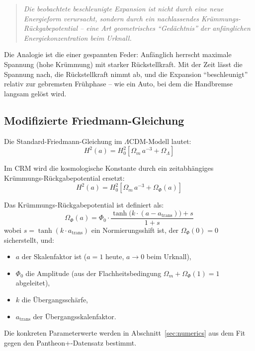 \documentclass[aps,prd,twocolumn,superscriptaddress,nofootinbib]{revtex4-2}
\begin{document}
\begin{quote}
\textit{Die beobachtete beschleunigte Expansion ist nicht durch eine neue Energieform verursacht, sondern durch ein nachlassendes Krümmungs-Rückgabepotential -- eine Art geometrisches ``Gedächtnis'' der anfänglichen Energiekonzentration beim Urknall.}
\end{quote}

Die Analogie ist die einer gespannten Feder: Anfänglich herrscht maximale Spannung (hohe Krümmung) mit starker Rückstellkraft. Mit der Zeit lässt die Spannung nach, die Rückstellkraft nimmt ab, und die Expansion ``beschleunigt'' relativ zur gebremsten Frühphase -- wie ein Auto, bei dem die Handbremse langsam gelöst wird.

\subsection{Modifizierte Friedmann-Gleichung}
\label{subsec:friedmann}

Die Standard-Friedmann-Gleichung im $\Lambda$CDM-Modell lautet:
\begin{equation}
H^2(a) = H_0^2 \left[\Omega_m\,a^{-3} + \Omega_\Lambda\right]
\label{eq:friedmann_lcdm}
\end{equation}

Im CRM wird die kosmologische Konstante durch ein zeitabhängiges Krümmungs-Rückgabepotential ersetzt:
\begin{equation}
H^2(a) = H_0^2 \left[\Omega_m\,a^{-3} + \Omega_\Phi(a)\right]
\label{eq:friedmann_cfm}
\end{equation}

Das Krümmungs-Rückgabepotential ist definiert als:
\begin{equation}
\Omega_\Phi(a) = \Phi_0 \cdot \frac{\tanh\!\big(k\cdot(a - a_{\mathrm{trans}})\big) + s}{1 + s}
\label{eq:potential_cfm}
\end{equation}
wobei $s = \tanh(k \cdot a_{\mathrm{trans}})$ ein Normierungsshift ist, der $\Omega_\Phi(0) = 0$ sicherstellt, und:
\begin{itemize}
\item $a$ der Skalenfaktor ist ($a=1$ heute, $a \to 0$ beim Urknall),
\item $\Phi_0$ die Amplitude (aus der Flachheitsbedingung $\Omega_m + \Omega_\Phi(1) = 1$ abgeleitet),
\item $k$ die Übergangsschärfe,
\item $a_{\mathrm{trans}}$ der Übergangsskalenfaktor.
\end{itemize}
Die konkreten Parameterwerte werden in Abschnitt~\ref{sec:numerics} aus dem Fit gegen den Pantheon+-Datensatz bestimmt.
\end{document}
